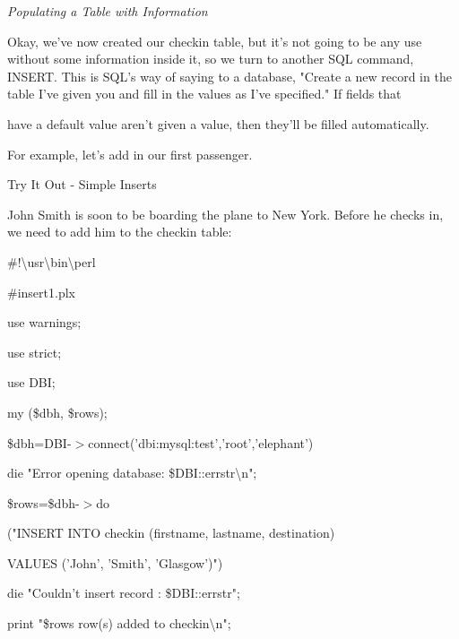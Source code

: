 \documentclass[a4paper,11pt]{book}
\begin{document}
\noindent 

\noindent \textit{Populating a Table with Information}

\noindent Okay, we've now created our checkin table, but it's not going to be any use without some information inside it, so we turn to another SQL command, INSERT. This is SQL's way of saying to a database, "Create a new record in the table I've given you and fill in the values as I've specified." If fields that

\noindent have a default value aren't given a value, then they'll be filled automatically.

\noindent 

\noindent For example, let's add in our first passenger.

\noindent 

\noindent Try It Out - Simple Inserts

\noindent John Smith is soon to be boarding the plane to New York. Before he checks in, we need to add him to the checkin table:

\noindent 

\noindent \#!\textbackslash usr\textbackslash bin\textbackslash perl

\noindent \#insert1.plx

\noindent 

\noindent use warnings;

\noindent use strict;

\noindent use DBI;

\noindent 

\noindent my (\$dbh, \$rows);

\noindent 

\noindent \$dbh=DBI-$>$connect('dbi:mysql:test','root','elephant')

\noindent \textbar \textbar  die "Error opening database: \$DBI::errstr\textbackslash n";

\noindent 

\noindent \$rows=\$dbh-$>$do

\noindent ("INSERT INTO checkin (firstname, lastname, destination)

\noindent VALUES ('John', 'Smith',  'Glasgow')")

\noindent \textbar \textbar  die "Couldn't insert record : \$DBI::errstr";

\noindent 

\noindent print "\$rows row(s) added to checkin\textbackslash n";

\noindent 
\end{document}
